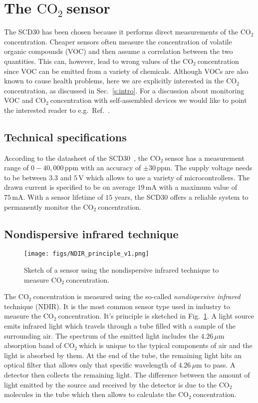 \documentclass[12pt,a4paper]{article}
\newcommand{\coo}{\ensuremath{\mathrm{CO_2}~}}
\begin{document}
\section{The \coo sensor}
The SCD30 has been chosen because it performs direct measurements of the \coo concentration. Cheaper sensors often measure the concentration of volatile organic compounds (VOC) and then assume a correlation between the two quantities. This can, however, lead to wrong values of the \coo concentration since VOC can be emitted from a variety of chemicals. Although VOCs are also known to cause health problems, here we are explicitly interested in the \coo concentration, as discussed in Sec.~\ref{s:intro}. For a discussion about monitoring VOC and \coo concentration with self-assembled devices we would like to point the interested reader 
to e.g.\ Ref.~\cite{CHIESA2019}.

\subsection{Technical specifications}
According to the datasheet of the SCD30~\cite{SENSIRION2020B}, the \coo sensor has a measurement range of $0 - 40,000\,\mathrm{ppm}$ with an accuracy of $\pm 30\,\mathrm{ppm}$.
The supply voltage needs to be between $3.3$ and $5\,\mathrm{V}$ which allows to use a variety of microcontrollers. The drawn current is specified to be on average $19\,\mathrm{mA}$ with a maximum value of $75\,\mathrm{mA}$. With a sensor lifetime of $15$ years, the SCD30 offers a reliable system to permanently monitor the \coo concentration.

\subsection{Nondispersive infrared technique}
\begin{figure}[ht]
\center
\texttt{[image: figs/NDIR\_principle\_v1.png]}
\caption{Sketch of a sensor using the nondispersive infrared technique to measure \coo concentration.}
\label{f:NDIR_sketch}
\end{figure}
The \coo concentration is measured using the so-called \textit{nondispersive infrared} technique (NDIR). It is the most common sensor type used in industry to measure the \coo concentration. It's principle is sketched in Fig.~\ref{f:NDIR_sketch}. A light source emits infrared light which travels through a tube filled with a sample of the surrounding air. The spectrum of the emitted light includes the $4.26\,\mu\mathrm{m}$ absorption band of \coo which is unique to the typical components of air and the light is absorbed by them. At the end of the tube, the remaining light hits an optical filter that allows only that specific wavelength of $4.26\,\mu\mathrm{m}$ to pass. A detector then collects the remaining light. The difference between the amount of light emitted by the source and received by the detector is due to the \coo molecules in the tube which then allows to calculate the \coo concentration. 
\end{document}

